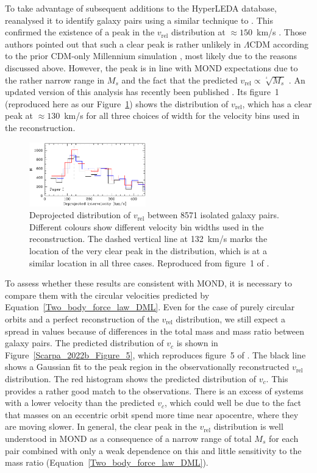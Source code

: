 \documentclass[fleqn,usenatbib,useAMS,onecolumn]{mnras} %
\begin{document}
To take advantage of subsequent additions to the HyperLEDA database, \citet{Scarpa_2022a} reanalysed it to identify galaxy pairs using a similar technique to \citet{Nottale_2020}. This confirmed the existence of a peak in the $v_{\text{rel}}$ distribution at $\approx 150$~km/s \citep[see figure~1 of][]{Scarpa_2022a}. Those authors pointed out that such a clear peak is rather unlikely in $\Lambda$CDM according to the prior CDM-only Millennium simulation \citep{Moreno_2013}, most likely due to the reasons discussed above. However, the peak is in line with MOND expectations due to the rather narrow range in $M_s$ and the fact that the predicted $v_{\text{rel}} \propto \sqrt[^4]{M_s}$ \citep[see figure~7 of][]{Scarpa_2022a}. An updated version of this analysis has recently been published \citep{Scarpa_2022b}. Its figure~1 (reproduced here as our Figure~\ref{Scarpa_2022b_Figure_1}) shows the distribution of $v_{\text{rel}}$, which has a clear peak at $\approx 130$~km/s for all three choices of width for the velocity bins used in the reconstruction.

\begin{figure}
	\centering
	\includegraphics[width=0.45\textwidth]{Scarpa_2022b_Figure_1}
	\caption{Deprojected distribution of $v_{\text{rel}}$ between 8571 isolated galaxy pairs. Different colours show different velocity bin widths used in the reconstruction. The dashed vertical line at 132~km/s marks the location of the very clear peak in the distribution, which is at a similar location in all three cases. Reproduced from figure~1 of \citet{Scarpa_2022b}.}
	\label{Scarpa_2022b_Figure_1}
\end{figure}

To assess whether these results are consistent with MOND, it is necessary to compare them with the circular velocities predicted by Equation~\ref{Two_body_force_law_DML}. Even for the case of purely circular orbits and a perfect reconstruction of the $v_{\text{rel}}$ distribution, we still expect a spread in values because of differences in the total mass and mass ratio between galaxy pairs. The predicted distribution of $v_c$ is shown in Figure~\ref{Scarpa_2022b_Figure_5}, which reproduces figure~5 of \citet{Scarpa_2022b}. The black line shows a Gaussian fit to the peak region in the observationally reconstructed $v_{\text{rel}}$ distribution. The red histogram shows the predicted distribution of $v_c$. This provides a rather good match to the observations. There is an excess of systems with a lower velocity than the predicted $v_c$, which could well be due to the fact that masses on an eccentric orbit spend more time near apocentre, where they are moving slower. In general, the clear peak in the $v_{\text{rel}}$ distribution is well understood in MOND as a consequence of a narrow range of total $M_s$ for each pair combined with only a weak dependence on this and little sensitivity to the mass ratio (Equation~\ref{Two_body_force_law_DML}).
\end{document}
